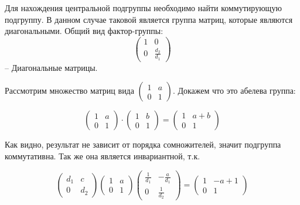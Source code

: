 \documentclass[10pt,a4paper]{article}
\begin{document}
 	Для нахождения центральной подгруппы необходимо найти коммутирующую 
 	подгруппу. В данном случае таковой является группа матриц, которые 
 	являются диагональными. Общий вид фактор-группы: 
 	\begin{equation}
 		\label{eq:mil}
 		\begin{pmatrix}
 			1 & 0\\
 			0 & \frac{d_{2}}{d_{1}}
		\end{pmatrix}	 			
 	\end{equation} -- Диагональные матрицы.
 	
 	Рассмотрим множество матриц вида $\begin{pmatrix}
 		1 & a\\
 		0 & 1
 	\end{pmatrix}$. Докажем что это абелева группа:
 	
 	\begin{equation}
 		\label{eq:ex_17_eq_01}
		\begin{pmatrix}
 		1 & a\\
 		0 & 1
 	\end{pmatrix} \cdot 
		\begin{pmatrix}
 		1 & b\\
 		0 & 1
 	\end{pmatrix}  = 
		\begin{pmatrix}
 		1 & a + b\\
 		0 & 1
 	\end{pmatrix} 	
 	\end{equation}
 	
 	Как видно, результат не зависит от порядка сомножителей, значит подгруппа коммутативна. Так же она является инвариантной, т.к.
 	
 	\begin{equation}
 	\label{eq:ex_17_02}
 	\begin{pmatrix}
 		d_{1} & c\\
 		0 & d_{2}
 	\end{pmatrix}
 	\begin{pmatrix}
 		1 & a \\
 		0 & 1
 	\end{pmatrix}
 	\begin{pmatrix}
 		\frac{1}{d_{1}} & -\frac{a}{d_{1}}\\
 		0 & \frac{1}{d_{2}}
 	\end{pmatrix}  =   
 	\begin{pmatrix}
 		1 & -a + 1\\
 		0 & 1
 	\end{pmatrix}
	\end{equation} 	 
	
\end{document}
